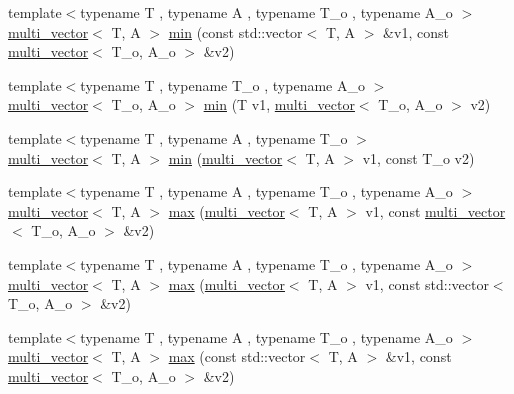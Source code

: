 \begin{DoxyCompactItemize}
\item 
{\footnotesize template$<$typename T , typename A , typename T\-\_\-o , typename A\-\_\-o $>$ }\\\hyperlink{classIceBRG_1_1multi__vector}{multi\-\_\-vector}$<$ T, A $>$ \hyperlink{namespaceIceBRG_af5f5bb2549b40fc144eaa8ff79955dbc}{min} (const std\-::vector$<$ T, A $>$ \&v1, const \hyperlink{classIceBRG_1_1multi__vector}{multi\-\_\-vector}$<$ T\-\_\-o, A\-\_\-o $>$ \&v2)
\item 
{\footnotesize template$<$typename T , typename T\-\_\-o , typename A\-\_\-o $>$ }\\\hyperlink{classIceBRG_1_1multi__vector}{multi\-\_\-vector}$<$ T\-\_\-o, A\-\_\-o $>$ \hyperlink{namespaceIceBRG_a41dfd1c517715eecd797955d5bbcfd3b}{min} (T v1, \hyperlink{classIceBRG_1_1multi__vector}{multi\-\_\-vector}$<$ T\-\_\-o, A\-\_\-o $>$ v2)
\item 
{\footnotesize template$<$typename T , typename A , typename T\-\_\-o $>$ }\\\hyperlink{classIceBRG_1_1multi__vector}{multi\-\_\-vector}$<$ T, A $>$ \hyperlink{namespaceIceBRG_a58195c6e7b76bbc581b38ccf2a393262}{min} (\hyperlink{classIceBRG_1_1multi__vector}{multi\-\_\-vector}$<$ T, A $>$ v1, const T\-\_\-o v2)
\item 
{\footnotesize template$<$typename T , typename A , typename T\-\_\-o , typename A\-\_\-o $>$ }\\\hyperlink{classIceBRG_1_1multi__vector}{multi\-\_\-vector}$<$ T, A $>$ \hyperlink{namespaceIceBRG_af201b849bae0a34deca8224b6ec33e31}{max} (\hyperlink{classIceBRG_1_1multi__vector}{multi\-\_\-vector}$<$ T, A $>$ v1, const \hyperlink{classIceBRG_1_1multi__vector}{multi\-\_\-vector}$<$ T\-\_\-o, A\-\_\-o $>$ \&v2)
\item 
{\footnotesize template$<$typename T , typename A , typename T\-\_\-o , typename A\-\_\-o $>$ }\\\hyperlink{classIceBRG_1_1multi__vector}{multi\-\_\-vector}$<$ T, A $>$ \hyperlink{namespaceIceBRG_aa9d3aa0facb2e56fbf35dc931bb377c3}{max} (\hyperlink{classIceBRG_1_1multi__vector}{multi\-\_\-vector}$<$ T, A $>$ v1, const std\-::vector$<$ T\-\_\-o, A\-\_\-o $>$ \&v2)
\item 
{\footnotesize template$<$typename T , typename A , typename T\-\_\-o , typename A\-\_\-o $>$ }\\\hyperlink{classIceBRG_1_1multi__vector}{multi\-\_\-vector}$<$ T, A $>$ \hyperlink{namespaceIceBRG_a4dfe17c79cc4b37a1e1e9de7abc72e8b}{max} (const std\-::vector$<$ T, A $>$ \&v1, const \hyperlink{classIceBRG_1_1multi__vector}{multi\-\_\-vector}$<$ T\-\_\-o, A\-\_\-o $>$ \&v2)

\end{DoxyCompactItemize}
